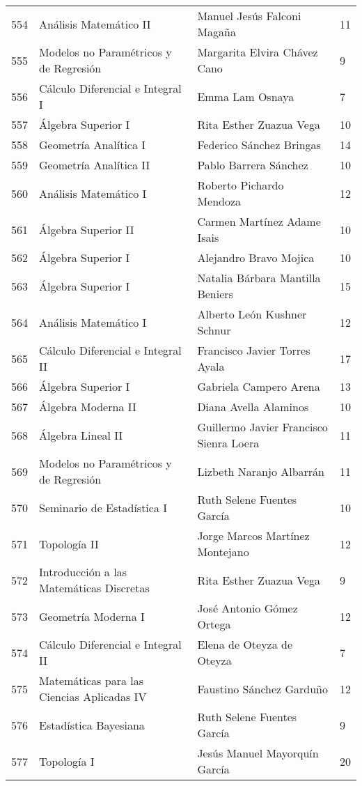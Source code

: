 \begin{table}[ht]
\begin{tabular}{rlll}
  554 & Análisis Matemático II & Manuel Jesús Falconi Magaña & 11 \\ 
  555 & Modelos no Paramétricos y de Regresión & Margarita Elvira Chávez Cano & 9 \\ 
  556 & Cálculo Diferencial e Integral I & Emma Lam Osnaya & 7 \\ 
  557 & Álgebra Superior I & Rita Esther Zuazua Vega & 10 \\ 
  558 & Geometría Analítica I & Federico Sánchez Bringas & 14 \\ 
  559 & Geometría Analítica II & Pablo Barrera Sánchez & 10 \\ 
  560 & Análisis Matemático I & Roberto Pichardo Mendoza & 12 \\ 
  561 & Álgebra Superior II & Carmen Martínez Adame Isais & 10 \\ 
  562 & Álgebra Superior I & Alejandro Bravo Mojica & 10 \\ 
  563 & Álgebra Superior I & Natalia Bárbara Mantilla Beniers & 15 \\ 
  564 & Análisis Matemático I & Alberto León Kushner Schnur & 12 \\ 
  565 & Cálculo Diferencial e Integral II & Francisco Javier Torres Ayala & 17 \\ 
  566 & Álgebra Superior I & Gabriela Campero Arena & 13 \\ 
  567 & Álgebra Moderna II & Diana Avella Alaminos & 10 \\ 
  568 & Álgebra Lineal II & Guillermo Javier Francisco Sienra Loera & 11 \\ 
  569 & Modelos no Paramétricos y de Regresión & Lizbeth Naranjo Albarrán & 11 \\ 
  570 & Seminario de Estadística I & Ruth Selene Fuentes García & 10 \\ 
  571 & Topología II & Jorge Marcos Martínez Montejano & 12 \\ 
  572 & Introducción a las Matemáticas Discretas & Rita Esther Zuazua Vega & 9 \\ 
  573 & Geometría Moderna I & José Antonio Gómez Ortega & 12 \\ 
  574 & Cálculo Diferencial e Integral II & Elena de Oteyza de Oteyza & 7 \\ 
  575 & Matemáticas para las Ciencias Aplicadas IV & Faustino Sánchez Garduño & 12 \\ 
  576 & Estadística Bayesiana & Ruth Selene Fuentes García & 9 \\ 
  577 & Topología I & Jesús Manuel Mayorquín García & 20 \\ 

\end{tabular}
\end{table}
